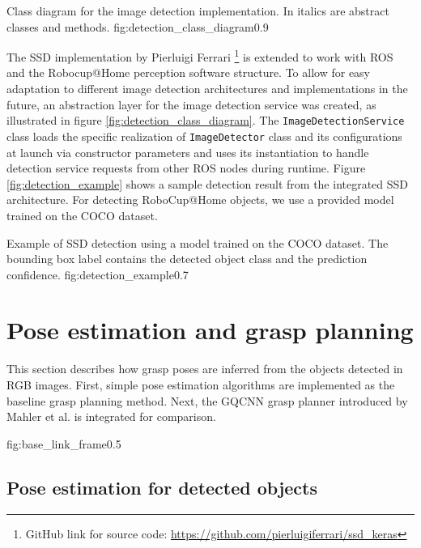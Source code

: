              {Class diagram for the image detection implementation. In italics are abstract classes and methods.}
             {fig:detection_class_diagram}{0.9\textwidth}

The SSD implementation by Pierluigi Ferrari \footnote{GitHub link for source code:
    \url{https://github.com/pierluigiferrari/ssd_keras}} is extended to work with ROS and the Robocup@Home perception
software structure. To allow for easy adaptation to different image detection architectures and implementations in the
future, an abstraction layer for the image detection service was created, as illustrated in figure
\ref{fig:detection_class_diagram}. The \texttt{ImageDetectionService} class loads the specific realization of
\texttt{ImageDetector} class and its configurations at launch via constructor parameters and uses its instantiation to
handle detection service requests from other ROS nodes during runtime. Figure \ref{fig:detection_example} shows a
sample detection result from the integrated SSD architecture. For detecting RoboCup@Home objects, we use a provided
model trained on the COCO dataset.

             {Example of SSD detection using a model trained on the COCO dataset. The bounding box label contains the
              detected object class and the prediction confidence.}
             {fig:detection_example}{0.7\textwidth}


\section{Pose estimation and grasp planning}

This section describes how grasp poses are inferred from the objects detected in RGB images. First, simple pose
estimation algorithms are implemented as the baseline grasp planning method. Next, the GQCNN grasp planner introduced
by Mahler et al. \cite{mahler2017} is integrated for comparison.

             {fig:base_link_frame}{0.5\textwidth}

\subsection{Pose estimation for detected objects} \label{sub:pose_estimation}

